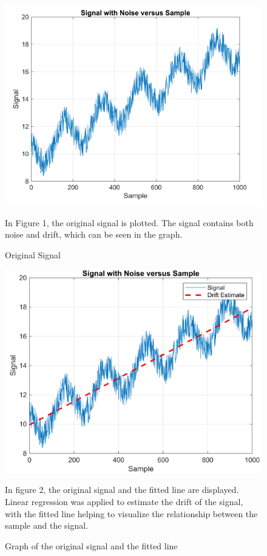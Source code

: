 \documentclass[journal]{IEEEtran}
\begin{document}
\begin{figure}[h] %
    \centering
    \includegraphics[width=\linewidth]{1.1.png}
    \caption{Original Signal}
    \vspace{1em} %
    \begin{minipage}{\linewidth}
        \small
        In Figure 1, the original signal is plotted. The signal contains both noise and drift, which can be seen in the graph.
    \end{minipage}
    \label{Part 1: Signal Graph}
\end{figure}

\begin{figure}[ht] %
    \centering
    \includegraphics[width=\linewidth]{3.1 plot.png}
    \caption{Graph of the original signal and the fitted line}
    \vspace{1em} %
    \begin{minipage}{\linewidth}
        \small
        In figure 2, the original signal and the fitted line are displayed. Linear regression was applied to estimate the drift of the signal, with the fitted line helping to visualize the relationship between the sample and the signal.
    \end{minipage}
    \label{Part 3: Fitted Line Graph}
\end{figure}
\end{document}

